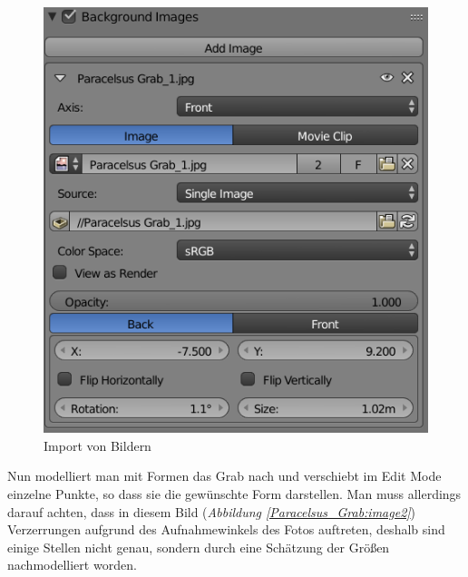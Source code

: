 \raggedbottom
\begin{figure}[H]
    \centering
    \includegraphics[width=.8\textwidth]{images/Paracelsus-Grab_Import-von-Bildern.png}
    \caption{Import von Bildern}
    \label{Paracelsus_Grab:image1}
\end{figure}

Nun modelliert man mit Formen das Grab nach und verschiebt im Edit Mode einzelne Punkte, so dass sie die gewünschte Form darstellen.
Man muss allerdings darauf achten, dass in diesem Bild (\textit{Abbildung \ref{Paracelsus_Grab:image2}}) Verzerrungen aufgrund des
Aufnahmewinkels des Fotos auftreten, deshalb sind einige Stellen nicht genau, sondern
durch eine Schätzung der Größen nachmodelliert worden.

